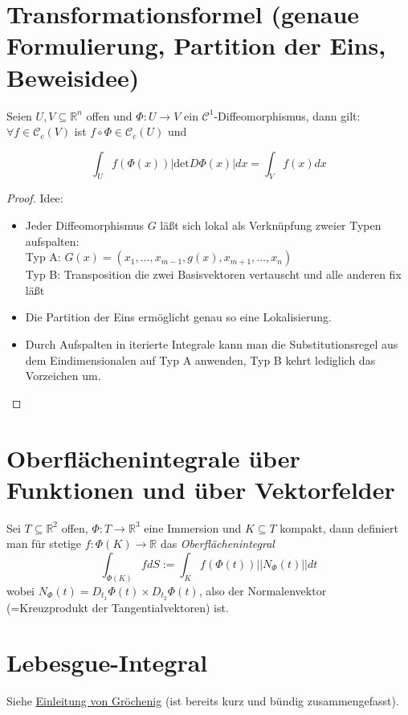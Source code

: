 \section{Transformationsformel (genaue Formulierung, Partition der Eins, Beweisidee)}
\begin{theorem}[Transformationsformel]
	Seien $U,V\subseteq\mathbb R^n$ offen und $\Phi : U\rightarrow V$ ein $\mathcal C^1$-Diffeomorphismus, dann gilt: $\forall f\in\mathcal C_c(V)$ ist $f\circ\Phi \in \mathcal C_c(U)$ und
	
	$$\int_U f(\Phi(x))|\text{det}D\Phi(x)|dx = \int_V f(x)dx$$
\end{theorem}
\begin{proof}
	Idee:
	\begin{itemize}
		\item Jeder Diffeomorphismus $G$ l\"a\ss t sich lokal als Verknüpfung zweier Typen aufspalten: \\Typ A: $G(x)=(x_1,\dots,x_{m-1},g(x),x_{m+1},\dots,x_n)$\\Typ B: Transposition die zwei Basisvektoren vertauscht und alle anderen fix l\"a\ss t
		\item Die Partition der Eins erm\"oglicht genau so eine Lokalisierung.
		\item Durch Aufspalten in iterierte Integrale kann man die Substitutionsregel aus dem Eindimensionalen auf Typ A anwenden, Typ B kehrt lediglich das Vorzeichen um.
	\end{itemize}
\end{proof}


\section{Oberfl\"achenintegrale \"uber Funktionen und \"uber Vektorfelder}
\begin{definition}
	Sei $T\subseteq \mathbb R^2$ offen, $\Phi:T\rightarrow \mathbb R^3$ eine Immersion und $K\subseteq T$ kompakt, dann definiert man f\"ur stetige $f:\Phi(K)\rightarrow \mathbb R$ das \textit{Oberfl\"achenintegral}
	$$\int_{\Phi(K)}fdS := \int_K f(\Phi(t))||N_\Phi(t)||dt$$ wobei $N_\Phi(t) = D_{t_1}\Phi(t)\times D_{t_2}\Phi(t)$, also der Normalenvektor (=Kreuzprodukt der Tangentialvektoren) ist.
\end{definition}

\begin{lemma}
	
\end{lemma}






\section{Lebesgue-Integral}
Siehe \href{http://homepage.univie.ac.at/karlheinz.groechenig/lebesgue.pdf}{Einleitung von Gr\"ochenig} (ist bereits kurz und b\"undig zusammengefasst).
